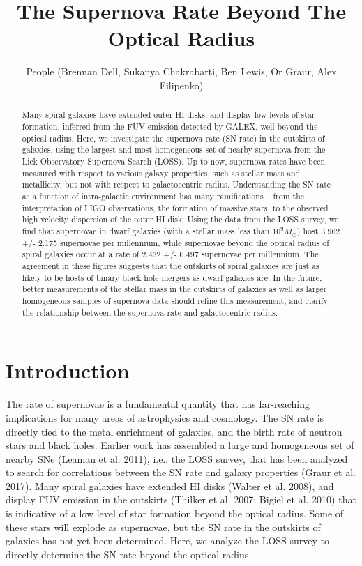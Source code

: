 \documentclass[apj]{emulateapj}
\begin{document}
\title{The Supernova Rate Beyond The Optical Radius}

\author{People (Brennan Dell, Sukanya Chakrabarti, Ben Lewis, Or Graur, Alex Filipenko)}

\begin{abstract}
Many spiral galaxies have extended outer HI disks, and display low levels of star formation, inferred from the FUV emission detected by GALEX, well beyond the optical radius. Here, we investigate the supernova rate (SN rate) in the outskirts of galaxies, using the largest and most homogeneous set of nearby supernova from the Lick Observatory Supernova Search (LOSS).    Up to now, supernova rates have been measured with respect to various galaxy properties, such as stellar mass and metallicity, but not with respect to galactocentric radius.  Understanding the SN rate as a function of intra-galactic environment has many ramifications -- from the interpretation of LIGO observations, the formation of massive stars, to the observed high velocity dispersion of the outer HI disk.  Using the data from the LOSS survey, we find that supernovae in dwarf galaxies (with a stellar mass less than $10^{9} M_{\odot}$) host 3.962 +/- 2.175 supernovae per millennium, while supernovae beyond the optical radius of spiral galaxies occur at a rate of 2.432 +/- 0.497 supernovae per millennium. The agreement in these figures suggests that the outskirts of spiral galaxies are just as likely to be hosts of binary black hole mergers as dwarf galaxies are. In the future, better measurements of the stellar mass in the outskirts of galaxies as well as larger homogeneous samples of supernova data should refine this measurement, and clarify the relationship between the supernova rate and galactocentric radius.
\end{abstract}

\section{Introduction}

The rate of supernovae is a fundamental quantity that has far-reaching implications for many areas of astrophysics and cosmology.  The SN rate is directly tied to the metal enrichment of galaxies, and the birth rate of neutron stars and black holes.  Earlier work has assembled a large and homogeneous set of nearby SNe (Leaman et al. 2011), i.e., the LOSS survey, that has been analyzed to search for correlations between the SN rate and galaxy properties (Graur et al. 2017).  Many spiral galaxies have extended HI disks (Walter et al. 2008), and display FUV emission in the outskirts (Thilker et al. 2007; Bigiel et al. 2010) that is indicative of a low level of star formation beyond the optical radius. Some of these stars will explode as supernovae, but the SN rate in the outskirts of galaxies has not yet been determined.  Here, we analyze the LOSS survey to directly determine the SN rate beyond the optical radius.
\end{document}
